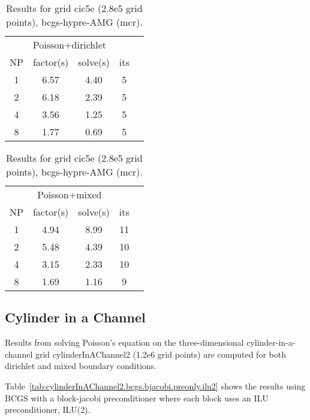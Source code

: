\begin{table}[hbt]
\begin{center}\footnotesize
\begin{tabular}{|c|c|c|c|l|} \hline 
\multicolumn{4}{|c|}{Poisson+dirichlet} \\
  NP   & factor(s)  & solve(s) &  its    \\\hline 
  1   &       6.57  &      4.40 & 5 \\
  2   &       6.18  &      2.39 & 5 \\
  4   &       3.56  &      1.25 & 5 \\
  8   &       1.77  &      0.69 & 5 \\
\hline
\end{tabular}		
\qquad
\begin{tabular}{|c|c|c|c|l|} \hline 
\multicolumn{4}{|c|}{Poisson+mixed} \\
  NP   & factor(s)  & solve(s) &  its    \\\hline 
  1   &       4.94  &      8.99 & 11 \\
  2   &       5.48  &      4.39 & 10 \\
  4   &       3.15  &      2.33 & 10 \\
  8   &       1.69  &      1.16 & 9 \\
\hline
\end{tabular}		
\end{center}		
\caption{Results for grid cic5e (2.8e5 grid points), bcgs-hypre-AMG (mcr).}
 \label{tab:cic5-bcgs-hypre-AMG} 
\end{table}





\clearpage
\subsection{Cylinder in a Channel}

Results from solving Poisson's equation on the three-dimensional cylinder-in-a-channel grid 
cylinderInAChannel2 (1.2e6 grid points) are computed
for both dirichlet and mixed boundary conditions.


Table~\ref{tab:cylinderInAChannel2.bcgs.bjacobi.preonly.ilu2}
shows the results using BCGS with a block-jacobi preconditioner where each
block uses an ILU preconditioner, ILU(2).


